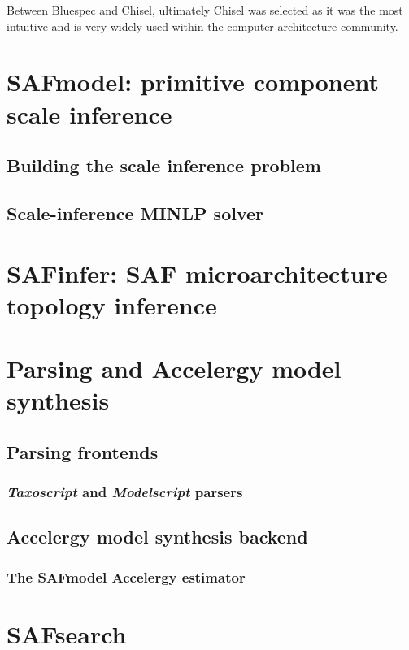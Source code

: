 Between Bluespec and Chisel, ultimately Chisel was selected as it was the most intuitive and is very widely-used within the computer-architecture community.

\section{SAFmodel: primitive component scale inference}

\subsection{Building the scale inference problem}

\subsection{Scale-inference MINLP solver}

\section{SAFinfer: SAF microarchitecture topology inference}

\subsection{}

\section{Parsing and Accelergy model synthesis}

\subsection{Parsing frontends}

\subsubsection{\textit{Taxoscript} and \textit{Modelscript} parsers}

\subsection{Accelergy model synthesis backend}

\subsubsection{The SAFmodel Accelergy estimator}

\section{SAFsearch}